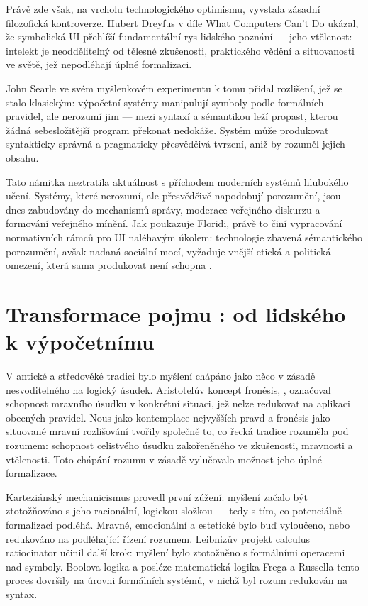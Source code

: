 Právě zde však, na vrcholu technologického optimismu, vyvstala zásadní filozofická kontroverze.
Hubert Dreyfus v díle What Computers Can't Do \parencite{Dreyfus92} ukázal, že symbolická UI přehlíží fundamentální rys lidského poznání — jeho vtělenost: intelekt je neoddělitelný od tělesné zkušenosti, praktického vědění a situovanosti ve světě, jež nepodléhají úplné formalizaci.

John Searle ve svém myšlenkovém experimentu  \parencite{Searle80} k tomu přidal rozlišení, jež se stalo klasickým: výpočetní systémy manipulují symboly podle formálních pravidel, ale nerozumí jim — mezi syntaxí a sémantikou leží propast, kterou žádná sebesložitější program překonat nedokáže.
Systém může produkovat syntakticky správná a pragmaticky přesvědčivá tvrzení, aniž by rozuměl jejich obsahu.

Tato námitka neztratila aktuálnost s příchodem moderních systémů hlubokého učení.
Systémy, které nerozumí, ale přesvědčivě napodobují porozumění, jsou dnes zabudovány do mechanismů správy, moderace veřejného diskurzu a formování veřejného mínění. Jak poukazuje Floridi, právě to činí vypracování normativních rámců pro UI naléhavým úkolem: technologie zbavená sémantického porozumění, avšak nadaná sociální mocí, vyžaduje vnější etická a politická omezení, která sama produkovat není schopna \parencite{Floridi23}.

\section{Transformace pojmu : od lidského k výpočetnímu}
V antické a středověké tradici bylo myšlení chápáno jako něco v zásadě nesvoditelného na logický úsudek.
Aristotelův koncept fronésis, , označoval schopnost mravního úsudku v konkrétní situaci, jež nelze redukovat na aplikaci obecných pravidel.
Nous jako kontemplace nejvyšších pravd a fronésis jako situované mravní rozlišování tvořily společně to, co řecká tradice rozuměla pod rozumem: schopnost celistvého úsudku zakořeněného ve zkušenosti, mravnosti a vtělenosti.
Toto chápání rozumu v zásadě vylučovalo možnost jeho úplné formalizace.

Karteziánský mechanicismus provedl první zúžení: myšlení začalo být ztotožňováno s jeho racionální, logickou složkou
— tedy s tím, co potenciálně formalizaci podléhá.
Mravné, emocionální a estetické bylo buď vyloučeno, nebo redukováno na  podléhající řízení rozumem.
Leibnizův projekt calculus ratiocinator učinil další krok: myšlení bylo ztotožněno s formálními operacemi nad symboly.
Boolova logika a posléze matematická logika Frega a Russella tento proces dovršily na úrovni formálních systémů, v nichž byl rozum redukován na syntax.


